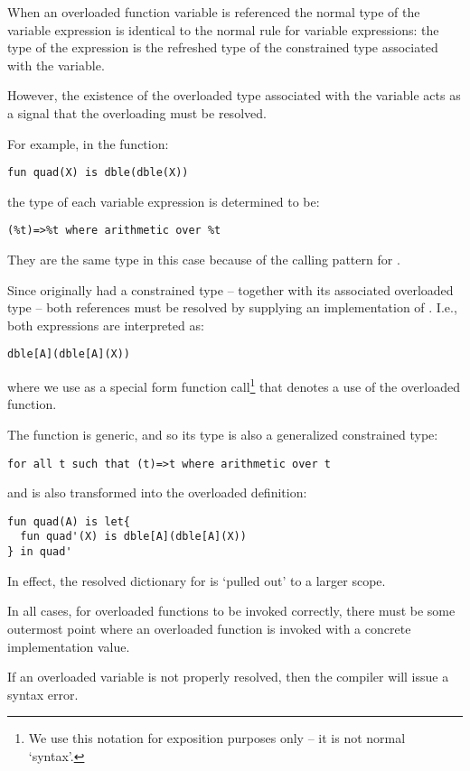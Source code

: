 When an overloaded function variable is referenced the normal type of the variable expression is identical to the normal rule for variable expressions: the type of the expression is the refreshed type of the constrained type associated with the variable.

However, the existence of the overloaded type associated with the variable acts as a signal that the overloading must be resolved.

For example, in the function:
\begin{lstlisting}
fun quad(X) is dble(dble(X))
\end{lstlisting}
the type of each  variable expression is determined to be:
\begin{lstlisting}
(%t)=>%t where arithmetic over %t
\end{lstlisting}
\begin{aside}
They are the same type in this case because of the calling pattern for .
\end{aside}

Since  originally had a constrained type -- together with its associated overloaded type -- both references must be resolved by supplying an implementation of . I.e., both  expressions are interpreted as:
\begin{lstlisting}
dble[A](dble[A](X))
\end{lstlisting}
where we use  as a special form function call\footnote{We use this notation for exposition purposes only -- it is not normal `\Sr syntax'.} that denotes a use of the overloaded function.

The  function is generic, and so its type is also a generalized constrained type:
\begin{lstlisting}
for all t such that (t)=>t where arithmetic over t
\end{lstlisting}
and is also transformed into the overloaded definition:
\begin{lstlisting}
fun quad(A) is let{
  fun quad'(X) is dble[A](dble[A](X))
} in quad'
\end{lstlisting}
In effect, the resolved dictionary for  is `pulled out' to a larger scope. 

In all cases, for overloaded functions to be invoked correctly, there must be some outermost point where an overloaded function is invoked with a concrete implementation value. 

If an overloaded variable is not properly resolved, then the compiler will issue a syntax error.

